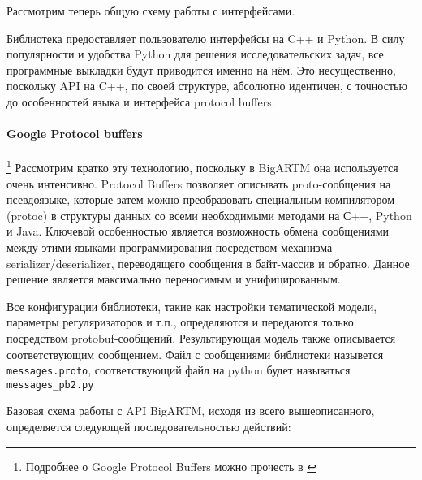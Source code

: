 Рассмотрим теперь общую схему работы с интерфейсами.

Библиотека предоставляет пользователю интерфейсы на C++ и Python. В силу популярности и удобства Python для решения исследовательских задач, все программные выкладки будут приводится именно на нём. Это несущественно, поскольку API на C++, по своей структуре, абсолютно идентичен, с точностью до особенностей языка и интерфейса protocol buffers. 

\paragraph{Google Protocol buffers}
\footnote{Подробнее о Google Protocol Buffers можно прочесть в \cite{protobuf}}
Рассмотрим кратко эту технологию, поскольку в BigARTM она используется очень интенсивно. Protocol Buffers позволяет описывать proto-сообщения на псевдоязыке, которые затем можно преобразовать специальным компилятором (protoc) в структуры данных со всеми необходимыми методами на С++, Python и Java. Ключевой особенностью является возможность обмена сообщениями между этими языками программирования посредством механизма serializer/deserializer, переводящего сообщения в байт-массив и обратно. Данное решение является максимально переносимым и унифицированным.

Все конфигурации библиотеки, такие как настройки тематической модели, параметры регуляризаторов и т.п., определяются и передаются только посредством protobuf-сообщений. Результирующая модель также описывается соответствующим сообщением. Файл с сообщениями библиотеки назывется \verb'messages.proto', соответствующий файл на python будет называться \verb'messages_pb2.py'

Базовая схема работы с API BigARTM, исходя из всего вышеописанного, определяется следующей последовательностью действий:

